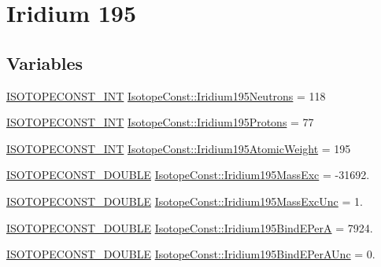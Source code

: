 \hypertarget{group___isotope_const-_iridium-_ir195}{}\section{Iridium 195}
\label{group___isotope_const-_iridium-_ir195}
\subsection*{Variables}
\begin{DoxyCompactItemize}
\item 
\mbox{\hyperlink{group___isotope_const-_macros_ga5f18360b3e99483a35c32d789e62621c}{I\+S\+O\+T\+O\+P\+E\+C\+O\+N\+S\+T\+\_\+\+I\+NT}} \mbox{\hyperlink{group___isotope_const-_iridium-_ir195_gafe2023d61adbbb63f7ee08d7fc460510}{Isotope\+Const\+::\+Iridium195\+Neutrons}} = 118
\item 
\mbox{\hyperlink{group___isotope_const-_macros_ga5f18360b3e99483a35c32d789e62621c}{I\+S\+O\+T\+O\+P\+E\+C\+O\+N\+S\+T\+\_\+\+I\+NT}} \mbox{\hyperlink{group___isotope_const-_iridium-_ir195_ga838b223a468798b5a7a4251ca7cdd99e}{Isotope\+Const\+::\+Iridium195\+Protons}} = 77
\item 
\mbox{\hyperlink{group___isotope_const-_macros_ga5f18360b3e99483a35c32d789e62621c}{I\+S\+O\+T\+O\+P\+E\+C\+O\+N\+S\+T\+\_\+\+I\+NT}} \mbox{\hyperlink{group___isotope_const-_iridium-_ir195_ga9fdf5996f67bd35c2b6386e848eef579}{Isotope\+Const\+::\+Iridium195\+Atomic\+Weight}} = 195
\item 
\mbox{\hyperlink{group___isotope_const-_macros_ga8f45a7272ce02c0b4c65c44636ed719a}{I\+S\+O\+T\+O\+P\+E\+C\+O\+N\+S\+T\+\_\+\+D\+O\+U\+B\+LE}} \mbox{\hyperlink{group___isotope_const-_iridium-_ir195_gab930d2aa3cd931a05397fb44af3555fd}{Isotope\+Const\+::\+Iridium195\+Mass\+Exc}} = -\/31692.
\item 
\mbox{\hyperlink{group___isotope_const-_macros_ga8f45a7272ce02c0b4c65c44636ed719a}{I\+S\+O\+T\+O\+P\+E\+C\+O\+N\+S\+T\+\_\+\+D\+O\+U\+B\+LE}} \mbox{\hyperlink{group___isotope_const-_iridium-_ir195_ga8dbb8cad5d304702bbd8c9fb74be722e}{Isotope\+Const\+::\+Iridium195\+Mass\+Exc\+Unc}} = 1.
\item 
\mbox{\hyperlink{group___isotope_const-_macros_ga8f45a7272ce02c0b4c65c44636ed719a}{I\+S\+O\+T\+O\+P\+E\+C\+O\+N\+S\+T\+\_\+\+D\+O\+U\+B\+LE}} \mbox{\hyperlink{group___isotope_const-_iridium-_ir195_gaa8db1fc7e3a52fb33860cb8cbb56f056}{Isotope\+Const\+::\+Iridium195\+Bind\+E\+PerA}} = 7924.
\item 
\mbox{\hyperlink{group___isotope_const-_macros_ga8f45a7272ce02c0b4c65c44636ed719a}{I\+S\+O\+T\+O\+P\+E\+C\+O\+N\+S\+T\+\_\+\+D\+O\+U\+B\+LE}} \mbox{\hyperlink{group___isotope_const-_iridium-_ir195_ga71b5b2e536d71af375ded3e040e8a70e}{Isotope\+Const\+::\+Iridium195\+Bind\+E\+Per\+A\+Unc}} = 0.

\end{DoxyCompactItemize}
